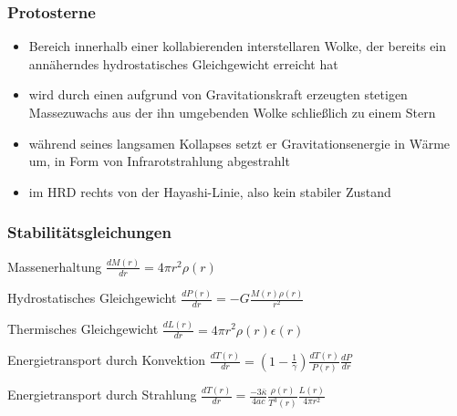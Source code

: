 \documentclass{beamer}
\begin{document}
\begin{frame}\frametitle{Protosterne}

\begin{itemize}
\item Bereich innerhalb einer kollabierenden interstellaren Wolke, der bereits ein annäherndes hydrostatisches Gleichgewicht erreicht hat
\item wird durch einen aufgrund von Gravitationskraft erzeugten stetigen Massezuwachs aus der ihn umgebenden Wolke schließlich zu einem Stern
\item während seines langsamen Kollapses setzt er Gravitationsenergie in Wärme um, in Form von Infrarotstrahlung abgestrahlt
\item im HRD rechts von der Hayashi-Linie, also kein stabiler Zustand
\end{itemize}

\end{frame}

\begin{frame}\frametitle{Stabilitätsgleichungen}

\tiny{
  
  \begin{block}{Massenerhaltung}
    $\frac{dM(r)}{dr} = 4 \pi r^2 \rho(r)$
  \end{block}
  
  
  \begin{block}{Hydrostatisches Gleichgewicht}
    $\frac{dP(r)}{dr} = -G \frac{M(r)\rho(r)}{r^2}$
  \end{block}
  
  
  \begin{block}{Thermisches Gleichgewicht}
    $\frac{dL(r)}{dr} = 4 \pi r^2 \rho(r) \epsilon(r)$
  \end{block}
  
  
  \begin{block}{Energietransport durch Konvektion}
    $\frac{dT(r)}{dr} = ( 1 - \frac{1}{\gamma} ) \frac{dT(r)}{P(r)} \frac{dP}{dr}$
  \end{block}
  
  
  \begin{block}{Energietransport durch Strahlung}
    $\frac{dT(r)}{dr} = \frac{-3\bar{\kappa}}{4ac} \frac{\rho(r)}{T^3(r)} \frac{L(r)}{4 \pi r^2}$
  \end{block}
  
}

\end{frame}
\end{document}
